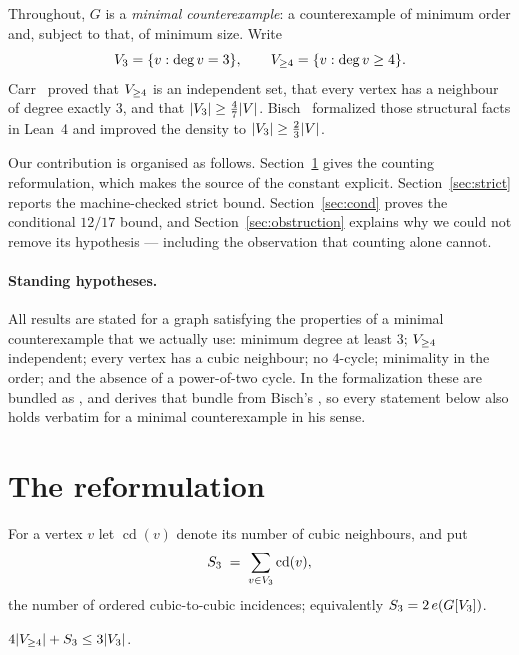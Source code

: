 \documentclass[11pt,a4paper]{article}
\begin{document}
Throughout, $G$ is a \emph{minimal counterexample}: a counterexample of minimum order and,
subject to that, of minimum size. Write
\[
  V_{3} = \{v : \operatorname{deg} v = 3\},
  \qquad
  V_{\ge 4} = \{v : \operatorname{deg} v \ge 4\}.
\]
Carr~\cite{Carr} proved that $V_{\ge 4}$ is an independent set, that every vertex has a
neighbour of degree exactly $3$, and that $\lvert V_{3} \rvert \ge \tfrac{4}{7}\lvert V \rvert$.
Bisch~\cite{Bisch} formalized those structural facts in Lean~4 and improved the density to
$\lvert V_{3} \rvert \ge \tfrac{2}{3}\lvert V \rvert$.

Our contribution is organised as follows. Section~\ref{sec:reform} gives the counting
reformulation, which makes the source of the constant explicit. Section~\ref{sec:strict}
reports the machine-checked strict bound. Section~\ref{sec:cond} proves the conditional
$12/17$ bound, and Section~\ref{sec:obstruction} explains why we could not remove its
hypothesis --- including the observation that counting alone cannot.

\paragraph{Standing hypotheses.}
All results are stated for a graph satisfying the properties of a minimal counterexample
that we actually use: minimum degree at least $3$; $V_{\ge 4}$ independent; every vertex has a
cubic neighbour; no $4$-cycle; minimality in the order; and the absence of a power-of-two
cycle. In the formalization these are bundled as , and
 derives that bundle from Bisch's , so every
statement below also holds verbatim for a minimal counterexample in his sense.

\section{The reformulation}\label{sec:reform}

\begin{definition}
For a vertex $v$ let $\operatorname{cd}(v)$ denote its number of cubic neighbours, and put
\[
  S_3 \;=\; \sum_{v \in V_{3}} \operatorname{cd}(v),
\]
the number of ordered cubic-to-cubic incidences; equivalently $S_3 = 2\,e(G[V_{3}])$.
\end{definition}

\begin{theorem}\label{thm:reform}
$4\lvert V_{\ge 4} \rvert + S_3 \le 3\lvert V_{3} \rvert$. 
\end{theorem}
\end{document}

